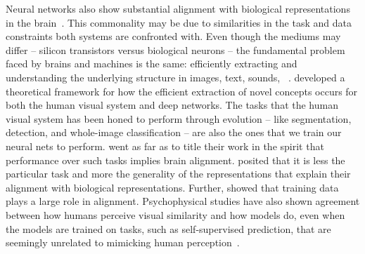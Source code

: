 \documentclass{article}
\newcommand{\jh}[1]{{\;\color{red}JH: #1}}
\theoremstyle{plain}
\theoremstyle{definition}
\theoremstyle{remark}
\begin{document}
Neural networks also show substantial alignment with biological representations in the brain~\cite{yamins2014performance}. This commonality may be due to similarities in the task and data constraints both systems are confronted with.
Even though the mediums may differ -- silicon transistors versus biological neurons -- the fundamental problem faced by brains and machines is the same: efficiently extracting and understanding the underlying structure in images, text, sounds, \etc~\cite{barlow1961possible, olshausen1997sparse}. \citet{sorscher2022neural} developed a theoretical framework for how the efficient extraction of novel concepts occurs for both the human visual system and deep networks. The tasks that the human visual system has been honed to perform through evolution -- like segmentation, detection, and whole-image classification -- are also the ones that we train our neural nets to perform. \citet{yamins2014performance} went as far as to title their work in the spirit that performance over such tasks implies brain alignment. \citet{antonello2024predictive} posited that it is less the particular task and more the generality of the representations that explain their alignment with biological representations. Further, \citet{conwell2022can} showed that training data plays a large role in alignment. Psychophysical studies have also shown agreement between how humans perceive visual similarity and how models do, even when the models are trained on tasks, such as self-supervised prediction, that are seemingly unrelated to mimicking human perception~\cite{zhang2018unreasonable}.%

\end{document}
